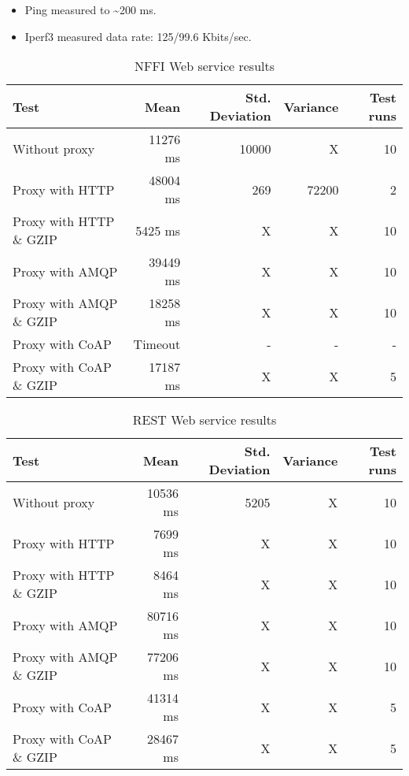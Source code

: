 \begin{appendices}
\begin{itemize}
	\item Ping measured to \textasciitilde 200 ms.
	\item Iperf3 measured data rate: 125/99.6 Kbits/sec.
\end{itemize}

\begin{table}[H]
\begin{tabular}{| l | r | r | r | r |}
\hline
  \textbf{Test} & \textbf{Mean} & \textbf{Std. Deviation} & \textbf{Variance} & \textbf{Test runs}\\ \hline
  Without proxy & 11276 ms & 10000 & X & 10 \\ \hline
  Proxy with HTTP & 48004 ms & 269 & 72200 & 2 \\ \hline
  Proxy with HTTP \& GZIP & 5425 ms & X & X & 10 \\ \hline
  Proxy with AMQP & 39449 ms & X & X & 10 \\ \hline
  Proxy with AMQP \& GZIP & 18258 ms & X & X & 10\\ \hline
  Proxy with CoAP & Timeout & - & - & - \\ \hline
  Proxy with CoAP \& GZIP & 17187 ms & X & X & 5 \\ \hline
\end{tabular}
\caption{NFFI Web service results}
\end{table}


\begin{table}[H]
\begin{tabular}{| l | r | r | r | r |}
\hline
  \textbf{Test} & \textbf{Mean} & \textbf{Std. Deviation} & \textbf{Variance} & \textbf{Test runs}\\ \hline
  Without proxy & 10536 ms & 5205 & X & 10 \\ \hline
  Proxy with HTTP & 7699 ms & X & X & 10 \\ \hline
  Proxy with HTTP \& GZIP & 8464 ms & X & X & 10 \\ \hline
  Proxy with AMQP & 80716 ms & X & X & 10 \\ \hline
  Proxy with AMQP \& GZIP & 77206 ms & X & X & 10\\ \hline
  Proxy with CoAP & 41314 ms & X & X & 5 \\ \hline
  Proxy with CoAP \& GZIP & 28467 ms & X & X & 5 \\ \hline
\end{tabular}
\caption{REST Web service results}
\end{table}



\end{appendices}
